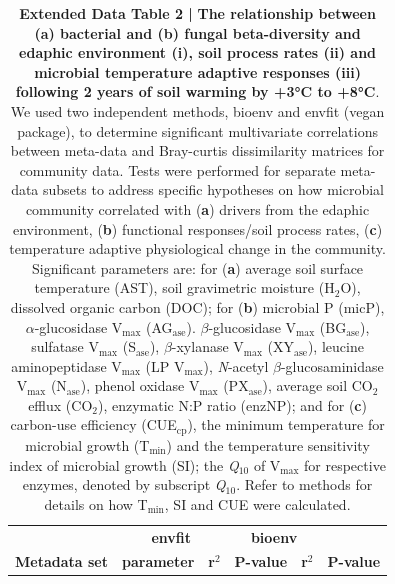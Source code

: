 \documentclass[
  letterpaper,
  DIV=11,
  numbers=noendperiod]{scrartcl}
\begin{document}
\begin{table}[H]

\caption{\textbf{Extended Data Table 2 |} \textbf{The relationship between (a) bacterial and (b) fungal beta-diversity and edaphic environment (i), soil process rates (ii) and microbial temperature adaptive responses (iii) following 2 years of soil warming by +3°C to +8°C}. We used two independent methods, bioenv and envfit (vegan package), to determine significant multivariate correlations between meta-data and Bray-curtis dissimilarity matrices for community data. Tests were performed for separate meta-data subsets to address specific hypotheses on how microbial community correlated with (\textbf{a}) drivers from the edaphic environment, (\textbf{b}) functional responses/soil process rates, (\textbf{c}) temperature adaptive physiological change in the community. Significant parameters are: for (\textbf{a}) average soil surface temperature (AST), soil gravimetric moisture (H$_{2}$O), dissolved organic carbon (DOC); for (\textbf{b}) microbial P (micP), $\alpha$-glucosidase V$_{\mathrm{max}}$ (AG$_{\mathrm{ase}}$). $\beta$-glucosidase V$_{\mathrm{max}}$ (BG$_{\mathrm{ase}}$), sulfatase V$_{\mathrm{max}}$ (S$_{\mathrm{ase}}$), $\beta$-xylanase V$_{\mathrm{max}}$ (XY$_{\mathrm{ase}}$), leucine aminopeptidase V$_{\mathrm{max}}$ (LP V$_{\mathrm{max}}$), \textsl{N}-acetyl $\beta$-glucosaminidase V$_{\mathrm{max}}$ (N$_{\mathrm{ase}}$), phenol oxidase V$_{\mathrm{max}}$ (PX$_{\mathrm{ase}}$), average soil CO$_{2}$ efflux (CO$_{2}$), enzymatic N:P ratio (enzNP); and for (\textbf{c}) carbon-use efficiency (CUE$_{\mathrm{cp}}$), the minimum temperature for microbial growth (T$_{\mathrm{min}}$) and the temperature sensitivity index of microbial growth (SI); the \textsl{Q}$_{10}$ of V$_{\mathrm{max}}$ for respective enzymes, denoted by subscript \textsl{Q}$_{10}$. Refer to methods for details on how T$_{\mathrm{min}}$, SI and CUE were calculated.}
\centering
\fontsize{9}{11}\selectfont
\begin{tabular}[t]{>{\raggedright\arraybackslash}p{24em}lcccc}
\toprule
\multicolumn{2}{l}{\bgroup\fontsize{10}{12}\selectfont \textbf{a) Bacteria}\egroup{}} & \multicolumn{2}{c}{\bgroup\fontsize{10}{12}\selectfont \textbf{envfit}\egroup{}} & \multicolumn{2}{c}{\bgroup\fontsize{10}{12}\selectfont \textbf{bioenv}\egroup{}} \\
\cmidrule(l{3pt}r{3pt}){1-2} \cmidrule(l{3pt}r{3pt}){3-4} \cmidrule(l{3pt}r{3pt}){5-6}
\begingroup\fontsize{9}{11}\selectfont \textbf{Metadata set}\endgroup & \begingroup\fontsize{9}{11}\selectfont \textbf{parameter}\endgroup & \begingroup\fontsize{9}{11}\selectfont \textbf{r$^{2}$}\endgroup & \begingroup\fontsize{9}{11}\selectfont \textbf{P-value}\endgroup & \begingroup\fontsize{9}{11}\selectfont \textbf{r$^{2}$}\endgroup & \begingroup\fontsize{9}{11}\selectfont \textbf{P-value}\endgroup\\

\end{tabular}
\end{table}
\end{document}

